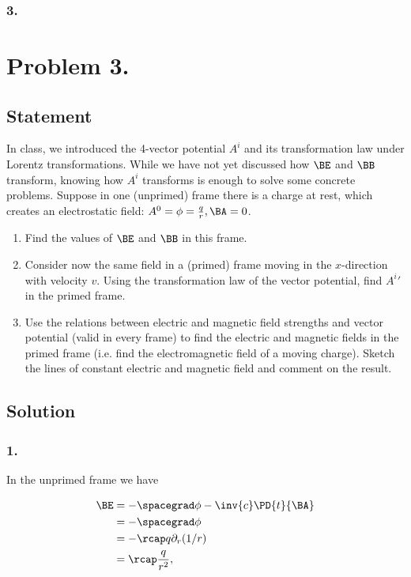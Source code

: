 \subsubsection{3.}

\section{Problem 3.}
\subsection{Statement}

In class, we introduced the 4-vector potential $A^i$ and its transformation law under Lorentz transformations.  While we have not yet discussed how $\BE$ and $\BB$ transform, knowing how $A^i$ transforms is enough to solve some concrete problems.  Suppose in one (unprimed) frame there is a charge at rest, which creates an electrostatic field: $A^0 = \phi = \frac{q}{r}, \BA = 0$.

\begin{enumerate}
\item Find the values of $\BE$ and $\BB$ in this frame.
\item Consider now the same field in a (primed) frame moving in the $x$-direction with velocity $v$.  Using the transformation law of the vector potential, find ${A^i}'$ in the primed frame.
\item Use the relations between electric and magnetic field strengths and vector potential (valid in every frame) to find the electric and magnetic fields in the primed frame (i.e. find the electromagnetic field of a moving charge).  Sketch the lines of constant electric and magnetic field and comment on the result.
\end{enumerate}

\subsection{Solution}
\subsubsection{1.}

In the unprimed frame we have

\begin{align*}
\BE 
&= - \spacegrad \phi - \inv{c} \PD{t}{\BA} \\
&= -\spacegrad \phi \\
&= - \rcap q \partial_r (1/r) \\
&= \rcap \frac{q}{r^2},
\end{align*}

